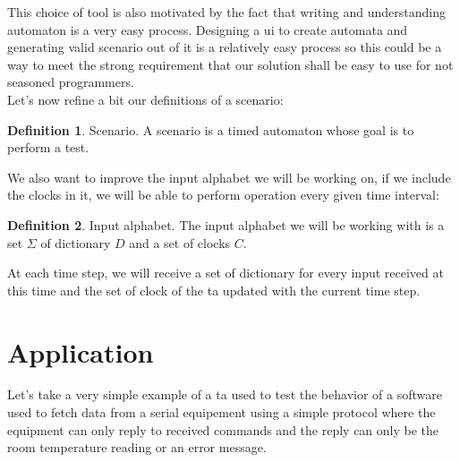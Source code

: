 \documentclass[12pt]{article}
\theoremstyle{definition}
\newtheorem{definition}{Definition}[section]
\theoremstyle{definition}
\theoremstyle{remark}
\begin{document}
This choice of tool is also motivated by the fact that writing and understanding automaton is a very easy process. Designing a \gls{ui} to create automata and generating valid scenario out of it is a relatively easy process so this could be a way to meet the strong requirement that our solution shall be easy to use for not seasoned programmers.\\

Let's now refine a bit our definitions of a scenario:
\theoremstyle{definition}
\begin{definition}{Scenario.} A scenario is a timed automaton whose goal is to perform a test.
\end{definition}

We also want to improve the input alphabet we will be working on, if we include the clocks in it, we will be able to perform operation every given time interval:
\theoremstyle{definition}
\begin{definition}{Input alphabet.} The input alphabet we will be working with is a set $\Sigma$ of dictionary $D$ and a set of clocks $C$.
\end{definition}

At each time step, we will receive a set of dictionary for every input received at this time and the set of clock of the \gls{ta} updated with the current time step.



\section{Application}
\label{secApplication}


Let's take a very simple example of a \gls{ta} used to test the behavior of a software used to fetch data from a serial equipement using a simple protocol where the equipment can only reply to received commands and the reply can only be the room temperature reading or an error message.
\end{document}
